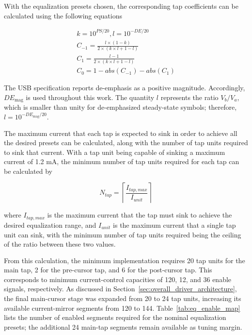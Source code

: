 With the equalization presets chosen, the corresponding tap coefficients can be calculated using the following equations

\begin{center}
\begin{align}
	k = 10^{PS/20},
	l = 10^{-DE/20} \\
	C_{-1} = \frac{l \times (1-k)}{2 \times (k\times l + 1 - l)} \\
	C_1 = \frac{l - 1}{2 \times (k\times l + 1 - l)} \\
	C_0 = 1 - abs(C_{-1}) - abs(C_1)
\end{align}
\end{center}

The \ac{USB} specification reports de-emphasis as a positive magnitude. Accordingly, $DE_{\mathrm{mag}}$ is used throughout this work. The quantity $l$ represents the ratio $V_b/V_a$, which is smaller than unity for de-emphasized steady-state symbols; therefore, $l=10^{-DE_{\mathrm{mag}}/20}$.

The maximum current that each tap is expected to sink in order to achieve all the desired presets can be calculated, along with the number of tap units required to sink that current. With a tap unit being capable of sinking a maximum current of 1.2 mA, the minimum number of tap units required for each tap can be calculated by

\begin{equation}
	N_{tap} = \left\lceil \frac{I_{tap,max}}{I_{unit}} \right\rceil
\end{equation}

where $I_{tap,max}$ is the maximum current that the tap must sink to achieve the desired equalization range, and $I_{unit}$ is the maximum current that a single tap unit can sink, with the minimum number of tap units required being the ceiling of the ratio between these two values.

From this calculation, the minimum implementation requires 20 tap units for the main tap, 2 for the pre-cursor tap, and 6 for the post-cursor tap. This corresponds to minimum current-control capacities of 120, 12, and 36 enable signals, respectively. As discussed in Section~\ref{sec:overall_driver_architecture}, the final main-cursor stage was expanded from 20 to 24 tap units, increasing its available current-mirror segments from 120 to 144. Table~\ref{tab:eq_enable_map} lists the number of enabled segments required for the nominal equalization presets; the additional 24 main-tap segments remain available as tuning margin.

